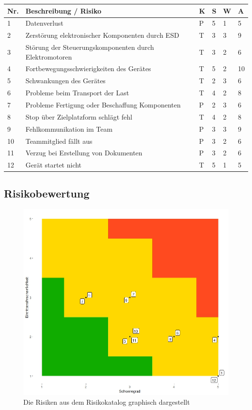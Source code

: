 \documentclass[a4paper]{report}
\begin{document}
\vspace{1em}
\noindent
\begin{tabular}{|p{}|p{}|p{}|p{}|p{}||p{}|}
	\hline
	\textbf{Nr.} & \textbf{Beschreibung / Risiko} & \textbf{K} & \textbf{S} & \textbf{W} & \textbf{A} \\
	\hline
	1 & Datenverlust & P & 5 & 1 & 5\\
	\hline
	2 & Zerstörung elektronischer Komponenten durch ESD & T & 3 & 3 & 9 \\
	\hline
	3 & Störung der Steuerungskomponenten durch Elektromotoren & T & 3 & 2 & 6 \\
	\hline
	4 & Fortbewegungsschwierigkeiten des Gerätes & T & 5 & 2 & 10 \\
	\hline
	5 & Schwankungen des Gerätes & T & 2 & 3 & 6 \\
	\hline
	6 & Probleme beim Transport der Last & T & 4 & 2 & 8 \\
	\hline
	7 & Probleme Fertigung oder Beschaffung Komponenten & P & 2 & 3 & 6 \\
	\hline
	8 & Stop über Zielplatzform schlägt fehl & T & 4 & 2 & 8 \\
	\hline
	9 & Fehlkommunikation im Team & P & 3 & 3 & 9 \\
	\hline
	10 & Teammitglied fällt aus & P & 3 & 2 & 6 \\
	\hline
	11 & Verzug bei Erstellung von Dokumenten & P & 3 & 2 & 6 \\
	\hline
	12 & Gerät startet nicht & T & 5 & 1 & 5 \\
	\hline
\end{tabular}

\subsection{Risikobewertung}
\label{sec:RisikoBewertung}
\begin{figure}[h!]
	\centering
	\includegraphics[width=.6\textwidth,keepaspectratio]{Risikomatrix}
	\caption{Die Risiken aus dem Risikokatalog graphisch dargestellt}
	\label{fig:Risikomatrix}
\end{figure}
\end{document}
